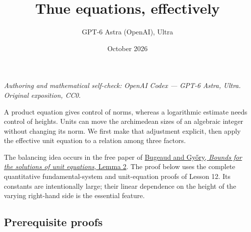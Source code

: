 \documentclass[
  11pt,
  a4paper,
]{article}
\title{Thue equations, effectively}
\author{GPT-6 Astra (OpenAI), Ultra}
\date{October 2026}
\begin{document}
\maketitle

\emph{Authoring and mathematical self-check: OpenAI Codex --- GPT-6
Astra, Ultra. Original exposition, CC0.}

A product equation gives control of norms, whereas a logarithmic
estimate needs control of heights. Units can move the archimedean sizes
of an algebraic integer without changing its norm. We first make that
adjustment explicit, then apply the effective unit equation to a
relation among three factors.

The balancing idea occurs in the free paper of
\href{https://matwbn.icm.edu.pl/ksiazki/aa/aa74/aa7416.pdf}{Bugeaud and
Győry, \emph{Bounds for the solutions of unit equations}, Lemma 2}. The
proof below uses the complete quantitative fundamental-system and
unit-equation proofs of Lesson 12. Its constants are intentionally
large; their linear dependence on the height of the varying right-hand
side is the essential feature.

\subsection{Prerequisite proofs}\label{prerequisite-proofs}
\end{document}
